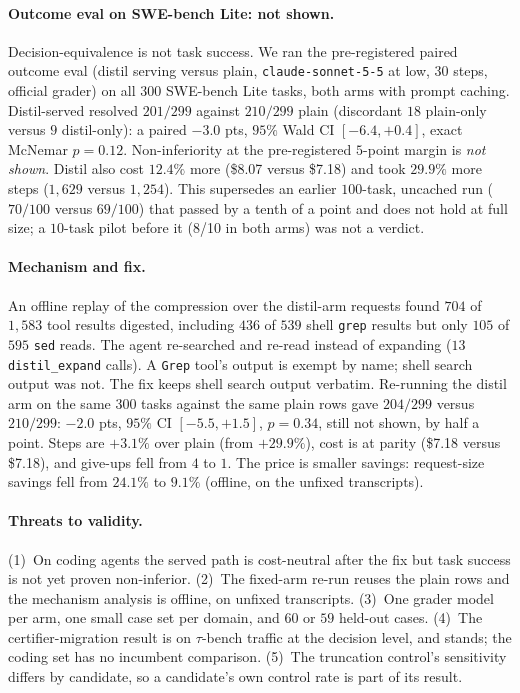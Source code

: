 \documentclass{article}
\begin{document}
\paragraph{Outcome eval on SWE-bench Lite: not shown.} Decision-equivalence is not task success.
We ran the pre-registered paired outcome eval (distil serving versus plain,
\texttt{claude-sonnet-5-5} at low, $30$ steps, official grader) on all $300$ SWE-bench Lite
tasks, both arms with prompt caching. Distil-served resolved $201/299$ against $210/299$ plain
(discordant $18$ plain-only versus $9$ distil-only): a paired $-3.0$ pts, $95\%$ Wald CI
$[-6.4,+0.4]$, exact McNemar $p=0.12$. Non-inferiority at the pre-registered $5$-point margin is
\emph{not shown}. Distil also cost $12.4\%$ more (\$8.07 versus \$7.18) and took $29.9\%$ more
steps ($1{,}629$ versus $1{,}254$). This supersedes an earlier $100$-task, uncached run ($70/100$
versus $69/100$) that passed by a tenth of a point and does not hold at full size; a $10$-task
pilot before it (8/10 in both arms) was not a verdict.

\paragraph{Mechanism and fix.} An offline replay of the compression over the distil-arm requests
found $704$ of $1{,}583$ tool results digested, including $436$ of $539$ shell \texttt{grep}
results but only $105$ of $595$ \texttt{sed} reads. The agent re-searched and re-read instead of
expanding ($13$ \texttt{distil\_expand} calls). A \texttt{Grep} tool's output is exempt by name;
shell search output was not. The fix keeps shell search output verbatim. Re-running the distil arm
on the same $300$ tasks against the same plain rows gave $204/299$ versus $210/299$: $-2.0$ pts,
$95\%$ CI $[-5.5,+1.5]$, $p=0.34$, still not shown, by half a point. Steps are $+3.1\%$ over
plain (from $+29.9\%$), cost is at parity (\$7.18 versus \$7.18), and give-ups fell from $4$ to
$1$. The price is smaller savings: request-size savings fell from $24.1\%$ to $9.1\%$ (offline,
on the unfixed transcripts).

\paragraph{Threats to validity.} (1)~On coding agents the served path is cost-neutral after the
fix but task success is not yet proven non-inferior. (2)~The fixed-arm re-run reuses the plain rows
and the mechanism analysis is offline, on unfixed transcripts. (3)~One grader model per arm, one
small case set per domain, and $60$ or $59$ held-out cases. (4)~The certifier-migration result is
on $\tau$-bench traffic at the decision level, and stands; the coding set has no incumbent
comparison. (5)~The truncation control's sensitivity differs by candidate, so a candidate's own
control rate is part of its result.
\end{document}

